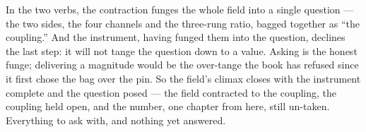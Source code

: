 In the two verbs, the contraction funges the whole field into a single question --- the two sides, the four channels and the
three-rung ratio, bagged together as ``the coupling.'' And the instrument, having funged them into the question, declines the
last step: it will not tange the question down to a value. Asking is the honest funge; delivering a magnitude would be the
over-tange the book has refused since it first chose the bag over the pin. So the field's climax closes with the instrument
complete and the question posed --- the field contracted to the coupling, the coupling held open, and the number, one chapter
from here, still un-taken. Everything to ask with, and nothing yet answered.
